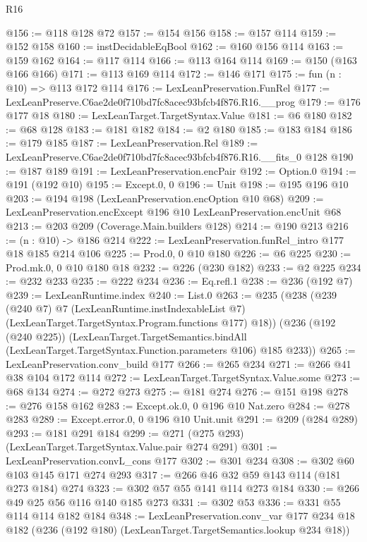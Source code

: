 \begin{lexlean}{R16}
\begin{coremodule}
@156 := @118 @128 @72
@157 := @154 @156
@158 := @157 @114
@159 := @152 @158
@160 := instDecidableEqBool
@162 := @160 @156 @114
@163 := @159 @162
@164 := @117 @114
@166 := @113 @164 @114
@169 := @150 (@163 @166 @166)
@171 := @113 @169 @114
@172 := @146 @171
@175 := fun (n : @10) => @113 @172 @114
@176 := LexLeanPreservation.FunRel
@177 := LexLeanPreserve.C6ae2de0f710bd7fc8acec93bfcb4f876.R16.__prog
@179 := @176 @177 @18
@180 := LexLeanTarget.TargetSyntax.Value
@181 := @6 @180
@182 := @68 @128
@183 := @181 @182
@184 := @2 @180
@185 := @183 @184
@186 := @179 @185
@187 := LexLeanPreservation.Rel
@189 := LexLeanPreserve.C6ae2de0f710bd7fc8acec93bfcb4f876.R16.__fits_0 @128
@190 := @187 @189
@191 := LexLeanPreservation.encPair
@192 := Option.{0}
@194 := @191 (@192 @10)
@195 := Except.{0, 0}
@196 := Unit
@198 := @195 @196 @10
@203 := @194 @198 (LexLeanPreservation.encOption @10 @68)
@209 := LexLeanPreservation.encExcept @196 @10 LexLeanPreservation.encUnit @68
@213 := @203 @209 (Coverage.Main.builders @128)
@214 := @190 @213
@216 := (n : @10) -> @186 @214
@222 := LexLeanPreservation.funRel_intro @177 @18 @185 @214 @106
@225 := Prod.{0, 0} @10 @180
@226 := @6 @225
@230 := Prod.mk.{0, 0} @10 @180 @18
@232 := @226 (@230 @182)
@233 := @2 @225
@234 := @232 @233
@235 := @222 @234
@236 := Eq.refl.{1}
@238 := @236 (@192 @7)
@239 := LexLeanRuntime.index
@240 := List.{0}
@263 := @235
    (@238
      (@239
        (@240 @7)
        @7
        (LexLeanRuntime.instIndexableList @7)
        (LexLeanTarget.TargetSyntax.Program.functions @177)
        @18))
    (@236
      (@192 (@240 @225))
      (LexLeanTarget.TargetSemantics.bindAll
        (LexLeanTarget.TargetSyntax.Function.parameters @106)
        @185
        @233))
@265 := LexLeanPreservation.conv_build @177
@266 := @265 @234
@271 := @266 @41 @38 @104 @172 @114
@272 := LexLeanTarget.TargetSyntax.Value.some
@273 := @68 @134
@274 := @272 @273
@275 := @181 @274
@276 := @151 @198
@278 := @276 @158 @162
@283 := Except.ok.{0, 0} @196 @10 Nat.zero
@284 := @278 @283
@289 := Except.error.{0, 0} @196 @10 Unit.unit
@291 := @209 (@284 @289)
@293 := @181 @291 @184
@299 := @271 (@275 @293) (LexLeanTarget.TargetSyntax.Value.pair @274 @291)
@301 := LexLeanPreservation.convL_cons @177
@302 := @301 @234
@308 := @302 @60 @103 @145 @171 @274 @293
@317 := @266 @46 @32 @59 @143 @114 (@181 @273 @184) @274
@323 := @302 @57 @55 @141 @114 @273 @184
@330 := @266 @49 @25 @56 @116 @140 @185 @273
@331 := @302 @53
@336 := @331 @55 @114 @114 @182 @184
@348 := LexLeanPreservation.conv_var
    @177
    @234
    @18
    @182
    (@236 (@192 @180) (LexLeanTarget.TargetSemantics.lookup @234 @18))

\end{coremodule}
\end{lexlean}
